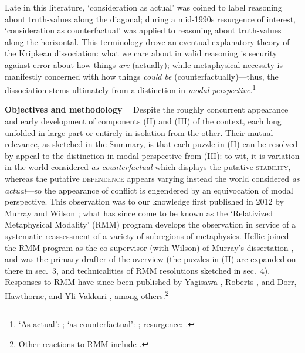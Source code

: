 \documentclass[12pt]{article}
\begin{document}
Late in this literature, `consideration as actual' was coined to label
reasoning about truth-values along the diagonal; during a mid-1990s resurgence
of interest, `consideration as counterfactual' was applied to reasoning about
truth-values along the horizontal. This terminology drove an eventual
explanatory theory of the Kripkean dissociation: what we care about in valid
reasoning is security against error about how things \emph{are} (actually);
while metaphysical necessity is manifestly concerned with how things
\emph{could be} (counterfactually)---thus, the dissociation stems ultimately
from a distinction in \emph{modal perspective}.\footnote{`As actual':
\citep{davieshumberstone81}; `as counterfactual':
\citep{chalmers96,jackson98}; resurgence:
\citep{jackson94,lewis94,blockstalnaker99,stalnaker01,chalmersosi,chalmersf2ds,gendlerhawthorne02}.} 

\bigskip{}

\noindent \textbf{Objectives and methodology} \, \,  Despite the roughly
concurrent appearance and early development of components (II) and (III) of
the context, each long unfolded in large part or entirely in isolation from
the other.  Their mutual relevance, as sketched in the Summary, is that each
puzzle in (II) can be resolved by appeal to the distinction in modal
perspective from (III): to wit, it is variation in the world considered
\emph{as counterfactual} which displays the putative \textsc{stability},
whereas the putative \textsc{dependence} appears varying instead the world
considered \emph{as actual}---so the appearance of conflict is engendered by
an equivocation of modal perspective. This observation was to our knowledge
first published in 2012 by Murray and Wilson \citep{murraywilson12}; what
has since come to be known as the `Relativized Metaphysical Modality' (RMM)
program develops the observation in service of a systematic reassessment of a
variety of subregions of metaphysics. Hellie joined the RMM program as
the co-supervisor (with Wilson) of Murray's dissertation \citep{murray17}, and
was the primary drafter of the overview \citep{hmw} (the puzzles in (II) are
expanded on there in sec.~3, and technicalities of RMM resolutions sketched in
sec.~4). Responses to RMM have since been published by Yagisawa
\citep{yagisawa}, Roberts \citep{Roberts2020-ROBTMA-11}, 
and Dorr, Hawthorne, and Yli-Vakkuri
\citep{Dorr2021-DORTBO-2}, among others.\footnote{Other reactions to RMM include 
\citep{LamForthcoming-LAMAIP-2,Clarke-Doane2019-CLAMAA-14,Bassford2020-BASART-3,Glazier2017-GLATDB-3,
Furtado2020-FURSAT}.} 
\end{document}
